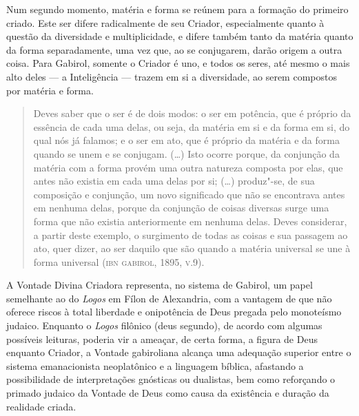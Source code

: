 Num segundo momento, matéria e forma se reúnem para a formação do
primeiro criado. Este ser difere radicalmente de seu Criador,
especialmente quanto à questão da diversidade e multiplicidade, e
difere também tanto da matéria quanto da forma separadamente, uma vez
que, ao se conjugarem, darão origem a outra coisa. Para Gabirol,
somente o Criador é uno, e todos os seres, até mesmo o mais alto
deles --- a Inteligência --- trazem em si a diversidade, ao serem
compostos por matéria e forma.

\begin{quote}
Deves saber que o ser é de dois modos: o ser em potência, que é
próprio da essência de cada uma delas, ou seja, da matéria em si e da
forma em si, do qual nós já falamos; e o ser em ato, que é próprio da
matéria e da forma quando se unem e se conjugam. (\ldots{}) Isto ocorre
porque, da conjunção da matéria com a forma provém uma outra natureza
composta por elas, que antes não existia em cada uma delas por si;
(\ldots{}) produz"-se, de sua composição e conjunção, um novo significado
que não se encontrava antes em nenhuma delas, porque da conjunção de
coisas diversas surge uma forma que não existia anteriormente em
nenhuma delas. Deves considerar, a partir deste exemplo, o surgimento
de todas as coisas e sua passagem ao ato, quer dizer, ao ser daquilo
que são quando a matéria universal se une à forma universal
(\textsc{ibn}
\textsc{gabirol}, 1895, \textsc{v}.9).
\end{quote}

A Vontade Divina Criadora representa, no sistema de Gabirol, um papel
semelhante ao do \emph{Logos} em Fílon de Alexandria, com a
vantagem de que não oferece riscos à total liberdade e onipotência de
Deus pregada pelo monoteísmo judaico. Enquanto o \emph{Logos}
filônico (deus segundo), de acordo com algumas possíveis leituras,
poderia vir a ameaçar, de certa forma, a figura de Deus enquanto
Criador, a Vontade gabiroliana alcança uma adequação superior entre o
sistema emanacionista neoplatônico e a linguagem bíblica, afastando a
possibilidade de interpretações gnósticas ou dualistas, bem como
reforçando o primado judaico da Vontade de Deus como causa da
existência e duração da realidade criada. 

